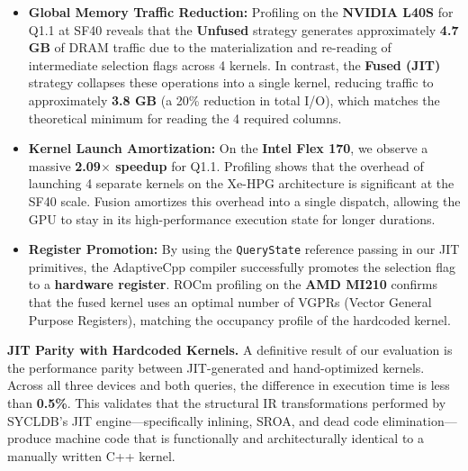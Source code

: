 \begin{itemize}
    \item \textbf{Global Memory Traffic Reduction:} Profiling on the \textbf{NVIDIA L40S} for Q1.1 at SF40 reveals that the \textbf{Unfused} strategy generates approximately \textbf{4.7 GB} of DRAM traffic due to the materialization and re-reading of intermediate selection flags across 4 kernels. In contrast, the \textbf{Fused (JIT)} strategy collapses these operations into a single kernel, reducing traffic to approximately \textbf{3.8 GB} (a 20\% reduction in total I/O), which matches the theoretical minimum for reading the 4 required columns.
    \item \textbf{Kernel Launch Amortization:} On the \textbf{Intel Flex 170}, we observe a massive \textbf{2.09$\times$ speedup} for Q1.1. Profiling shows that the overhead of launching 4 separate kernels on the Xe-HPG architecture is significant at the SF40 scale. Fusion amortizes this overhead into a single dispatch, allowing the GPU to stay in its high-performance execution state for longer durations.
    \item \textbf{Register Promotion:} By using the \texttt{QueryState} reference passing in our JIT primitives, the AdaptiveCpp compiler successfully promotes the selection flag to a \textbf{hardware register}. ROCm profiling on the \textbf{AMD MI210} confirms that the fused kernel uses an optimal number of VGPRs (Vector General Purpose Registers), matching the occupancy profile of the hardcoded kernel.
\end{itemize}

\textbf{JIT Parity with Hardcoded Kernels.}
A definitive result of our evaluation is the performance parity between JIT-generated and hand-optimized kernels. Across all three devices and both queries, the difference in execution time is less than \textbf{0.5\%}. This validates that the structural IR transformations performed by SYCLDB's JIT engine---specifically inlining, SROA, and dead code elimination---produce machine code that is functionally and architecturally identical to a manually written C++ kernel.
